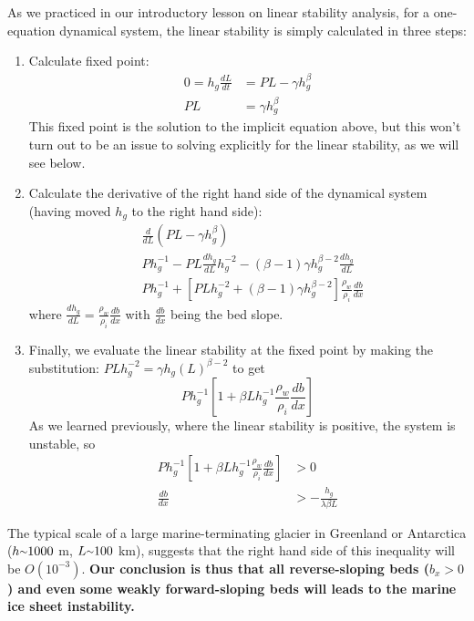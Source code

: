 \documentclass[12pt]{article}
\theoremstyle{definition}
\newcommand{\mytilde}{\raise.17ex\hbox{$\scriptstyle\mathtt{\sim}$}}
\begin{document}
As we practiced in our introductory lesson on linear stability analysis, for a one-equation dynamical system, the linear stability is simply calculated in three steps:
\begin{enumerate}
\item Calculate fixed point: 
\begin{align}
0 = h_g \frac{dL}{dt} &= PL - \gamma h_g^\beta \\
PL  &= \gamma h_g^\beta
\end{align}
This fixed point is the solution to the implicit equation above, but this won't turn out to be an issue to solving explicitly for the linear stability, as we will see below.
\item Calculate the derivative of the right hand side of the dynamical system (having moved $h_g$ to the right hand side):
\begin{align}
& \frac{d}{dL} \left(PL - \gamma h_g^\beta \right) \\
& Ph_g^{-1} - PL \frac{dh_g}{dL} h_g^{-2} - (\beta-1) \gamma h_g^{\beta-2} \frac{dh_g}{dL} \\
& Ph_g^{-1} + \left[PL h_g^{-2} + (\beta-1) \gamma h_g^{\beta-2} \right] \frac{\rho_w}{\rho_i} \frac{db}{dx}
\end{align}
where $\frac{dh_g}{dL} = \frac{\rho_w}{\rho_i} \frac{db}{dx}$ with $\frac{db}{dx}$ being the bed slope.
\item Finally, we evaluate the linear stability at the fixed point by making the substitution: $PL h_g^{-2}  = \gamma h_g(L)^{\beta-2}$ to get
\begin{equation}
Ph_g^{-1} \left[1 + \beta L h_g^{-1} \frac{\rho_w}{\rho_i} \frac{db}{dx} \right]
\end{equation}
As we learned previously, where the linear stability is positive, the system is unstable, so
\begin{align}
Ph_g^{-1} \left[1 + \beta L h_g^{-1} \frac{\rho_w}{\rho_i} \frac{db}{dx} \right] &> 0 \\
\frac{db}{dx} &> - \frac{h_g}{\lambda \beta L}
\end{align}
\end{enumerate}
The typical scale of a large marine-terminating glacier in Greenland or Antarctica ($h \mytilde 1000$ m, $L \mytilde 100$ km), suggests that the right hand side of this inequality will be $O(10^{-3})$. \textbf{Our conclusion is thus that all reverse-sloping beds ($b_x>0$) and even some weakly forward-sloping beds will leads to the marine ice sheet instability.}




\end{document}
